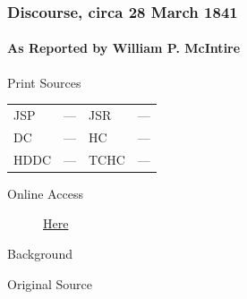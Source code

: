 		\subsubsection{Discourse, circa 28 March 1841}
			\label{EMS-1841-JS-CIR-28-MAR-1841}
			
			\paragraph{As Reported by William P. McIntire}
				\label{EMS-1841-JS-CIR-28-MAR-1841-WM}
			
				\begin{description}
					\item[Print Sources]
				\end{description}

				\begin{tabular}{p{0.5in}p{1in}p{0.5in}p{1in}}
					JSP	 	& ---		& JSR 		& --- \\
					DC	 	& ---		& HC 		& --- \\
					HDDC 	& ---		& TCHC 		& --- \\
				\end{tabular}
				
				\begin{description}
					\item[Online Access] \href{https://www.josephsmithpapers.org/paper-summary/discourse-circa-28march-1841/1}{Here}
				\end{description}
				
				\begin{description}
					\item[Background]
				\end{description}
				
				
				\begin{description}
					\item[Original Source]
				\end{description}
				
